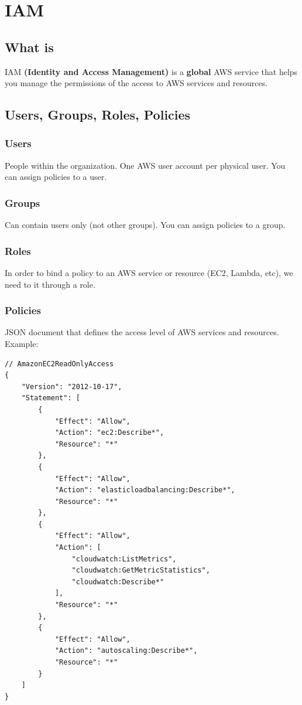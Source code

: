 \section{IAM}\label{sec:iam}

\subsection{What is}\label{subsec:what-is}
IAM \textbf{(Identity and Access Management)} is a \textbf{global} AWS service that helps you manage
the permissions of the access to AWS services and resources.

\subsection{Users, Groups, Roles, Policies}\label{subsec:users-groups-roles-policies}

\subsubsection{Users}
People within the organization.
One AWS user account per physical user.
You can assign policies to a user.

\subsubsection{Groups}
Can contain users only (not other groups).
You can assign policies to a group.

\subsubsection{Roles}
In order to bind a policy to an AWS service or resource (EC2, Lambda, etc), we need to it through a role.

\subsubsection{Policies}
JSON document that defines the access level of AWS services and resources.
Example:


\begin{lstlisting}[basicstyle=\small,label={lst:policy}]
// AmazonEC2ReadOnlyAccess
{
    "Version": "2012-10-17",
    "Statement": [
        {
            "Effect": "Allow",
            "Action": "ec2:Describe*",
            "Resource": "*"
        },
        {
            "Effect": "Allow",
            "Action": "elasticloadbalancing:Describe*",
            "Resource": "*"
        },
        {
            "Effect": "Allow",
            "Action": [
                "cloudwatch:ListMetrics",
                "cloudwatch:GetMetricStatistics",
                "cloudwatch:Describe*"
            ],
            "Resource": "*"
        },
        {
            "Effect": "Allow",
            "Action": "autoscaling:Describe*",
            "Resource": "*"
        }
    ]
}
\end{lstlisting}

